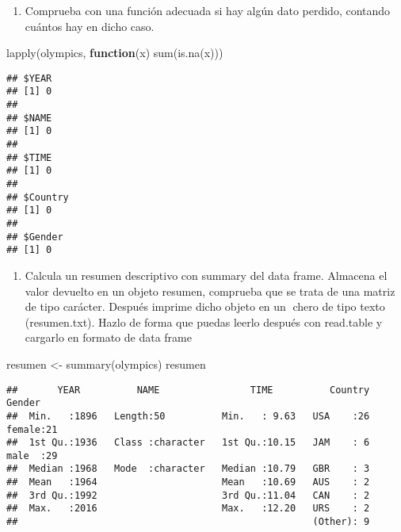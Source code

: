 \documentclass[
]{article}
\newenvironment{Shaded}{\begin{snugshade}}{\end{snugshade}}
\newcommand{\ControlFlowTok}[1]{\textcolor[rgb]{0.13,0.29,0.53}{\textbf{#1}}}
\newcommand{\FunctionTok}[1]{\textcolor[rgb]{0.00,0.00,0.00}{#1}}
\newcommand{\NormalTok}[1]{#1}
\newcommand{\OtherTok}[1]{\textcolor[rgb]{0.56,0.35,0.01}{#1}}
\providecommand{\tightlist}{%
  \setlength{\itemsep}{0pt}\setlength{\parskip}{0pt}}
\begin{document}
\begin{enumerate}
\def\labelenumi{\arabic{enumi}.}
\setcounter{enumi}{1}
\tightlist
\item
  Comprueba con una función adecuada si hay algún dato perdido, contando
  cuántos hay en dicho caso.
\end{enumerate}

\begin{Shaded}
\begin{Highlighting}[]
\FunctionTok{lapply}\NormalTok{(olympics, }\ControlFlowTok{function}\NormalTok{(x) }\FunctionTok{sum}\NormalTok{(}\FunctionTok{is.na}\NormalTok{(x)))}
\end{Highlighting}
\end{Shaded}

\begin{verbatim}
## $YEAR
## [1] 0
## 
## $NAME
## [1] 0
## 
## $TIME
## [1] 0
## 
## $Country
## [1] 0
## 
## $Gender
## [1] 0
\end{verbatim}

\begin{enumerate}
\def\labelenumi{\arabic{enumi}.}
\setcounter{enumi}{2}
\tightlist
\item
  Calcula un resumen descriptivo con summary del data frame. Almacena el
  valor devuelto en un objeto resumen, comprueba que se trata de una
  matriz de tipo carácter. Después imprime dicho objeto en un chero de
  tipo texto (resumen.txt). Hazlo de forma que puedas leerlo después con
  read.table y cargarlo en formato de data frame
\end{enumerate}

\begin{Shaded}
\begin{Highlighting}[]
\NormalTok{resumen }\OtherTok{\textless{}{-}} \FunctionTok{summary}\NormalTok{(olympics)}
\NormalTok{resumen}
\end{Highlighting}
\end{Shaded}

\begin{verbatim}
##       YEAR          NAME                TIME          Country      Gender  
##  Min.   :1896   Length:50          Min.   : 9.63   USA    :26   female:21  
##  1st Qu.:1936   Class :character   1st Qu.:10.15   JAM    : 6   male  :29  
##  Median :1968   Mode  :character   Median :10.79   GBR    : 3              
##  Mean   :1964                      Mean   :10.69   AUS    : 2              
##  3rd Qu.:1992                      3rd Qu.:11.04   CAN    : 2              
##  Max.   :2016                      Max.   :12.20   URS    : 2              
##                                                    (Other): 9
\end{verbatim}
\end{document}
